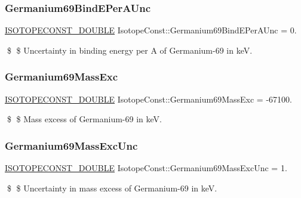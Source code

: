 \subsubsection{\texorpdfstring{Germanium69\+Bind\+E\+Per\+A\+Unc}{Germanium69BindEPerAUnc}}
{\footnotesize\ttfamily \mbox{\hyperlink{group___isotope_const-_macros_ga8f45a7272ce02c0b4c65c44636ed719a}{I\+S\+O\+T\+O\+P\+E\+C\+O\+N\+S\+T\+\_\+\+D\+O\+U\+B\+LE}} Isotope\+Const\+::\+Germanium69\+Bind\+E\+Per\+A\+Unc = 0.}

\$ \$ Uncertainty in binding energy per A of Germanium-\/69 in keV. \mbox{\label{group___isotope_const-_germanium-_ge69_gae4d06bbc58cd9d3b1b71b9b6b6f66bdb}} 
\subsubsection{\texorpdfstring{Germanium69\+Mass\+Exc}{Germanium69MassExc}}
{\footnotesize\ttfamily \mbox{\hyperlink{group___isotope_const-_macros_ga8f45a7272ce02c0b4c65c44636ed719a}{I\+S\+O\+T\+O\+P\+E\+C\+O\+N\+S\+T\+\_\+\+D\+O\+U\+B\+LE}} Isotope\+Const\+::\+Germanium69\+Mass\+Exc = -\/67100.}

\$ \$ Mass excess of Germanium-\/69 in keV. \mbox{\label{group___isotope_const-_germanium-_ge69_ga9ed158efd7ff6d7a151b1740c6742a25}} 
\subsubsection{\texorpdfstring{Germanium69\+Mass\+Exc\+Unc}{Germanium69MassExcUnc}}
{\footnotesize\ttfamily \mbox{\hyperlink{group___isotope_const-_macros_ga8f45a7272ce02c0b4c65c44636ed719a}{I\+S\+O\+T\+O\+P\+E\+C\+O\+N\+S\+T\+\_\+\+D\+O\+U\+B\+LE}} Isotope\+Const\+::\+Germanium69\+Mass\+Exc\+Unc = 1.}

\$ \$ Uncertainty in mass excess of Germanium-\/69 in keV. \mbox{\label{group___isotope_const-_germanium-_ge69_gaa84972b8cf15725f3a7158dd05d8baa8}} 
